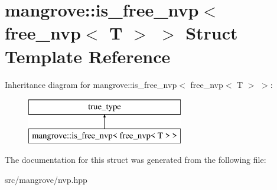 \hypertarget{structmangrove_1_1is__free__nvp_3_01free__nvp_3_01T_01_4_01_4}{}\section{mangrove\+:\+:is\+\_\+free\+\_\+nvp$<$ free\+\_\+nvp$<$ T $>$ $>$ Struct Template Reference}
\label{structmangrove_1_1is__free__nvp_3_01free__nvp_3_01T_01_4_01_4}
Inheritance diagram for mangrove\+:\+:is\+\_\+free\+\_\+nvp$<$ free\+\_\+nvp$<$ T $>$ $>$\+:\begin{figure}[H]
\begin{center}
\leavevmode
\includegraphics[height=2.000000cm]{structmangrove_1_1is__free__nvp_3_01free__nvp_3_01T_01_4_01_4}
\end{center}
\end{figure}


The documentation for this struct was generated from the following file\+:\begin{DoxyCompactItemize}
\item 
src/mangrove/nvp.\+hpp\end{DoxyCompactItemize}
